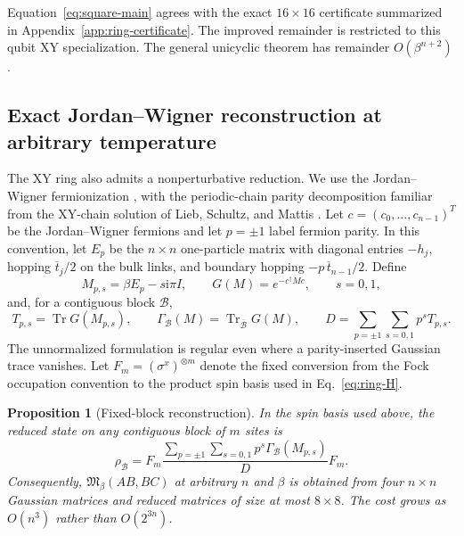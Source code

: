 \documentclass[aps,prb,preprint,nofootinbib,longbibliography]{revtex4-2}
\newcommand{\Tr}{\operatorname{Tr}}
\newcommand{\Mmod}{\mathfrak{M}}
\newcommand{\ii}{\mathrm{i}}
\newtheorem{proposition}[theorem]{Proposition}
\begin{document}
Equation~\eqref{eq:square-main} agrees with the exact $16\times16$
certificate summarized in Appendix~\ref{app:ring-certificate}.  The improved
remainder is restricted to this qubit XY specialization.  The general
unicyclic theorem has remainder $O(\beta^{n+2})$.

\subsection{Exact Jordan--Wigner reconstruction at arbitrary temperature}

The XY ring also admits a nonperturbative reduction.  We use the
Jordan--Wigner fermionization \cite{JordanWigner1928}, with the periodic-chain
parity decomposition familiar from the XY-chain solution of Lieb, Schultz,
and Mattis \cite{LiebSchultzMattis1961}.  Let
$c=(c_0,\ldots,c_{n-1})^T$ be the Jordan--Wigner fermions and let $p=\pm1$
label fermion parity.  In this convention, let $E_p$ be the
$n\times n$ one-particle matrix with diagonal entries $-h_j$, hopping
$\overline t_j/2$ on the bulk links, and boundary hopping
$-p\,\overline t_{n-1}/2$.  Define
\begin{equation}
 M_{p,s}=\beta E_p-s\ii\pi I,
 \qquad
 G(M)=e^{-c^\dagger Mc},
 \qquad s=0,1,
 \label{eq:Gaussian-pieces}
\end{equation}
and, for a contiguous block $\mathcal B$,
\begin{equation}
 T_{p,s}=\Tr G(M_{p,s}),\qquad
 \Gamma_{\mathcal B}(M)=\Tr_{\overline{\mathcal B}}G(M),
 \qquad
 D=\sum_{p=\pm1}\sum_{s=0,1}p^sT_{p,s}.
 \label{eq:Gamma-block}
\end{equation}
The unnormalized formulation is regular even where a parity-inserted
Gaussian trace vanishes.  Let
$F_m=(\sigma^x)^{\otimes m}$ denote the fixed conversion from the Fock
occupation convention to the product spin basis used in
Eq.~\eqref{eq:ring-H}.

\begin{proposition}[Fixed-block reconstruction]
\label{prop:JW-reconstruction}
In the spin basis used above, the reduced state on any contiguous block of
$m$ sites is
\begin{equation}
 \rho_{\mathcal B}
 =F_m\frac{\displaystyle
 \sum_{p=\pm1}\sum_{s=0,1}p^s\Gamma_{\mathcal B}(M_{p,s})}{D}
 F_m.
 \label{eq:rho-block-JW}
\end{equation}
Consequently, $\Mmod_\beta(AB,BC)$ at arbitrary $n$ and $\beta$ is obtained
from four $n\times n$ Gaussian matrices and reduced matrices of size at most
$8\times8$.  The cost grows as $O(n^3)$ rather than $O(2^{3n})$.
\end{proposition}
\end{document}
